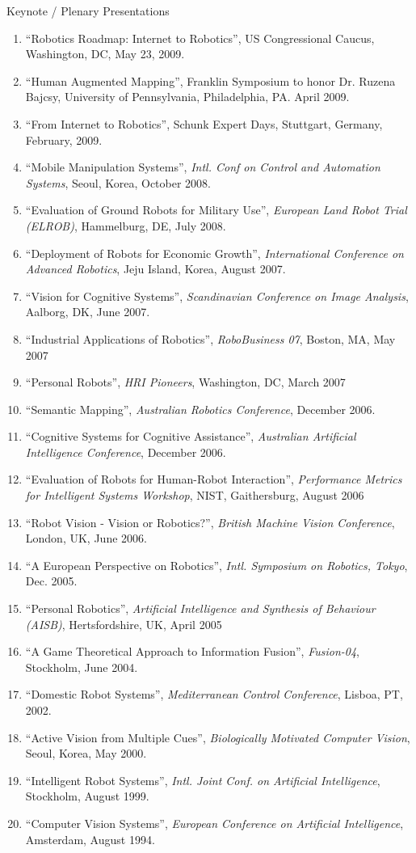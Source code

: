 \documentclass{article}
\begin{document}
\begin{cv}
\begin{cvlist}{Keynote / Plenary Presentations}
\begin{enumerate}
  \item ``Robotics Roadmap: Internet to Robotics'', US Congressional Caucus, Washington, DC, May 23, 2009.
  \item ``Human Augmented Mapping'', Franklin Symposium to honor Dr. Ruzena Bajcsy, University of Pennsylvania, Philadelphia,
    PA. April 2009.
  \item ``From Internet to Robotics'', Schunk Expert Days, Stuttgart, Germany, February, 2009.
  \item ``Mobile Manipulation Systems'', {\em Intl. Conf on Control
    and Automation Systems}, Seoul, Korea, October 2008.
  \item ``Evaluation of Ground Robots for Military Use'', {\em
    European Land Robot Trial (ELROB)}, Hammelburg, DE, July 2008.
  \item ``Deployment of Robots for Economic Growth'', {\em
    International Conference on Advanced Robotics}, Jeju Island,
    Korea, August 2007.
  \item ``Vision for Cognitive Systems'', {\em Scandinavian Conference
    on Image Analysis}, Aalborg, DK, June 2007.
  \item ``Industrial Applications of Robotics'', {\em RoboBusiness
    07}, Boston, MA, May 2007
  \item ``Personal Robots'', {\em HRI Pioneers}, Washington, DC, March
    2007
  \item ``Semantic Mapping'', {\em Australian Robotics Conference},
    December 2006.
  \item ``Cognitive Systems for Cognitive Assistance'', {\em
    Australian Artificial Intelligence Conference}, December 2006.
  \item ``Evaluation of Robots for Human-Robot Interaction'', {\em
    Performance Metrics for Intelligent Systems Workshop}, NIST,
    Gaithersburg, August 2006
  \item ``Robot Vision - Vision or Robotics?'', {\em British Machine
    Vision Conference}, London, UK, June 2006.
  \item ``A European Perspective on Robotics'', {\em Intl. Symposium
    on Robotics, Tokyo}, Dec. 2005.
  \item ``Personal Robotics'', {\em Artificial Intelligence and
    Synthesis of Behaviour (AISB)}, Hertsfordshire, UK, April 2005
  \item ``A Game Theoretical Approach to Information Fusion'', {\em
    Fusion-04}, Stockholm, June 2004.
  \item ``Domestic Robot Systems'', {\em Mediterranean Control
    Conference}, Lisboa, PT, 2002.
  \item ``Active Vision from Multiple Cues'', {\em Biologically
    Motivated Computer Vision}, Seoul, Korea, May 2000.
  \item ``Intelligent Robot Systems'', {\em Intl. Joint Conf. on
    Artificial Intelligence}, Stockholm, August 1999.
  \item ``Computer Vision Systems'', {\em European Conference on
    Artificial Intelligence}, Amsterdam, August 1994.
  \end{enumerate}
\end{cvlist}


\end{cv}
\end{document}
